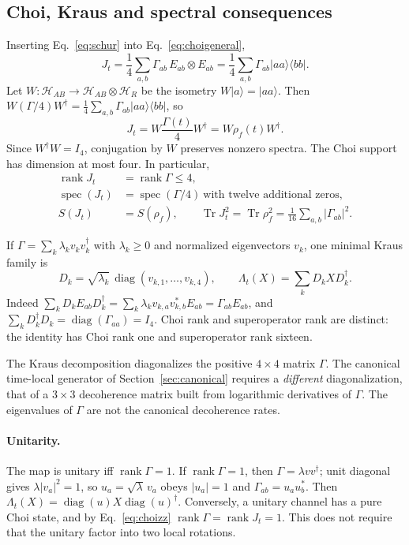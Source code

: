 \documentclass[11pt,a4paper]{article}
\newcommand{\ket}[1]{\lvert #1\rangle}
\newcommand{\bra}[1]{\langle #1\rvert}
\newcommand{\Tr}{\operatorname{Tr}}
\newcommand{\diag}{\operatorname{diag}}
\newcommand{\rank}{\operatorname{rank}}
\newcommand{\spec}{\operatorname{spec}}
\newcommand{\HH}{\mathcal H}
\begin{document}
\subsection{Choi, Kraus and spectral consequences}
\label{sec:choikraus}

Inserting Eq.~\eqref{eq:schur} into Eq.~\eqref{eq:choigeneral},
\begin{equation}
 J_t=\frac14\sum_{a,b}\Gamma_{ab}\,E_{ab}\otimes E_{ab}
 =\frac14\sum_{a,b}\Gamma_{ab}\ket{aa}\bra{bb}.
\end{equation}
Let $W:\HH_{AB}\to\HH_{AB}\otimes\HH_R$ be the isometry $W\ket a=\ket{aa}$.
Then $W(\Gamma/4)W^\dagger=\frac14\sum_{a,b}\Gamma_{ab}\ket{aa}\bra{bb}$, so
\begin{equation}
 J_t=W\frac{\Gamma(t)}4W^\dagger=W\rho_f(t)W^\dagger.
 \label{eq:choizz}
\end{equation}
Since $W^\dagger W=I_4$, conjugation by $W$ preserves nonzero spectra.
The Choi support has dimension at most four. In particular,
\begin{align}
 \rank J_t&=\rank\Gamma\le4,\\
 \spec(J_t)&=\spec(\Gamma/4)\ \text{with twelve additional zeros},\\
 S(J_t)&=S(\rho_f),\qquad
 \Tr J_t^2=\Tr\rho_f^2=\frac1{16}\sum_{a,b}|\Gamma_{ab}|^2.
 \label{eq:choipurity}
\end{align}

If $\Gamma=\sum_k\lambda_kv_kv_k^\dagger$ with $\lambda_k\ge0$ and
normalized eigenvectors $v_k$, one minimal Kraus family is
\begin{equation}
 D_k=\sqrt{\lambda_k}\,\diag(v_{k,1},\ldots,v_{k,4}),
 \qquad \Lambda_t(X)=\sum_k D_kXD_k^\dagger.
 \label{eq:diagkraus}
\end{equation}
Indeed $\sum_kD_kE_{ab}D_k^\dagger=\sum_k\lambda_kv_{k,a}v_{k,b}^*E_{ab}
=\Gamma_{ab}E_{ab}$, and $\sum_kD_k^\dagger D_k=\diag(\Gamma_{aa})=I_4$.
Choi rank and superoperator rank are distinct: the identity has Choi
rank one and superoperator rank sixteen.

The Kraus decomposition diagonalizes the positive $4\times4$ matrix
$\Gamma$. The canonical time-local generator of Section~\ref{sec:canonical}
requires a \emph{different} diagonalization, that of a $3\times3$
decoherence matrix built from logarithmic derivatives of $\Gamma$.
The eigenvalues of $\Gamma$ are not the canonical decoherence rates.

\paragraph{Unitarity.}
The map is unitary iff $\rank\Gamma=1$. If $\rank\Gamma=1$, then
$\Gamma=\lambda vv^\dagger$; unit diagonal gives $\lambda|v_a|^2=1$, so
$u_a=\sqrt\lambda\,v_a$ obeys $|u_a|=1$ and $\Gamma_{ab}=u_au_b^*$. Then
$\Lambda_t(X)=\diag(u)X\diag(u)^\dagger$. Conversely, a unitary channel has
a pure Choi state, and by Eq.~\eqref{eq:choizz} $\rank\Gamma=\rank J_t=1$.
This does not require that the unitary factor into two local rotations.
\end{document}
